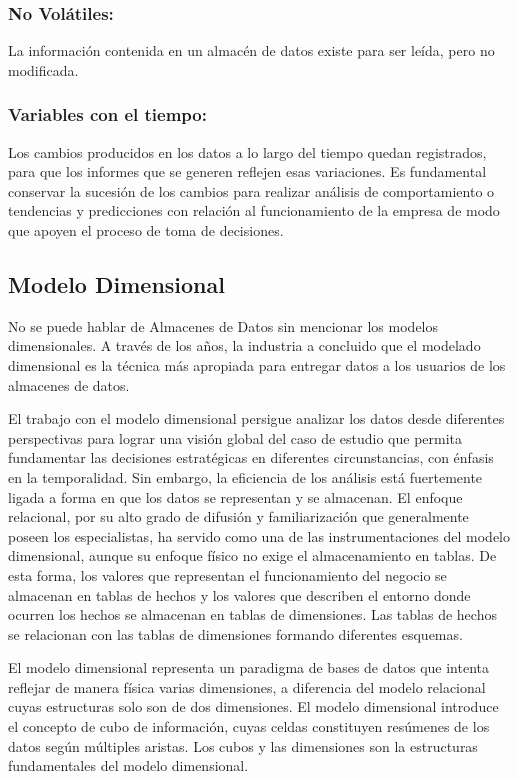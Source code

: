 \subsubsection{No Vol\'atiles:}
La información contenida en un almac\'en de datos existe para ser leída, pero no modificada.

\subsubsection{Variables con el tiempo:}
Los cambios producidos en los datos a lo largo del tiempo quedan registrados, para que los informes que se generen reflejen 
esas variaciones. Es fundamental conservar la sucesión de los cambios para realizar análisis de comportamiento o tendencias y 
predicciones con relación al funcionamiento de la empresa de modo que apoyen el proceso de toma de decisiones.


\subsection{Modelo Dimensional}

No se puede hablar de Almacenes de Datos sin mencionar los modelos dimensionales. A través de los a\~{n}os, la industria 
a concluido que el modelado dimensional es la técnica m\'as apropiada para entregar datos a los usuarios de los 
almacenes de datos.

El trabajo con el modelo dimensional persigue analizar los datos desde diferentes perspectivas para lograr una visión 
global del caso de estudio que permita fundamentar las decisiones estratégicas en diferentes circunstancias, con énfasis 
en la temporalidad. Sin embargo, la eficiencia de los análisis est\'a fuertemente ligada a forma en que los datos 
se representan y se almacenan. El enfoque relacional, por su alto grado de difusión y familiarización que generalmente 
poseen los especialistas, ha servido como una de las instrumentaciones del modelo dimensional, aunque su enfoque f\'isico 
no exige el almacenamiento en tablas. De esta forma, los valores que representan el funcionamiento del negocio se almacenan 
en tablas de hechos y los valores que describen el entorno donde ocurren los hechos se almacenan en tablas de dimensiones.
Las tablas de hechos se relacionan con las tablas de dimensiones formando diferentes esquemas.

El modelo dimensional representa un paradigma de bases de datos que intenta reflejar de manera física varias dimensiones, 
a diferencia del modelo relacional cuyas estructuras solo son de dos dimensiones. El modelo dimensional introduce el concepto 
de cubo de información, cuyas celdas constituyen resúmenes de los datos según m\'ultiples aristas. Los cubos y las dimensiones 
son la estructuras fundamentales del modelo dimensional.


